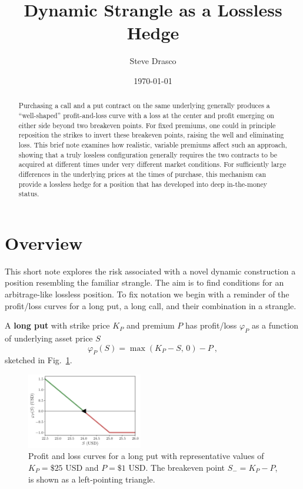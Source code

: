 \documentclass[aps,reprint]{revtex4-2}
\begin{document}
\title{Dynamic Strangle as a Lossless Hedge}
\author{Steve Drasco}
\date{\today}

\begin{abstract}
Purchasing a call and a put contract on the same underlying generally produces a “well-shaped” profit-and-loss curve with a loss at the center and profit emerging on either side beyond two breakeven points. For fixed premiums, one could in principle reposition the strikes to invert these breakeven points, raising the well and eliminating loss. This brief note examines how realistic, variable premiums affect such an approach, showing that a truly lossless configuration generally requires the two contracts to be acquired at different times under very different market conditions. For sufficiently large differences in the underlying prices at the times of purchase, this mechanism can provide a lossless hedge for a position that has developed into deep in-the-money status.
\end{abstract}

\maketitle

\section{Overview}

This short note explores the risk associated with a novel dynamic construction a position resembling the familiar strangle.  The aim is to find conditions for an arbitrage-like lossless position.  To fix notation we begin with a reminder of the profit/loss curves for a long put, a long call, and their combination in a strangle. 

A \textbf{long put} with strike price $K_P$ and premium $P$ has profit/loss $\varphi_P$ as a function of underlying asset price $S$
\begin{equation}
\varphi_P(S) = \max(K_P - S,\,0) - P~,
\end{equation}
sketched in Fig.~\ref{fig:put}.
\begin{figure}[hb]
    \centering
    \includegraphics[width=0.45\textwidth]{figs/put.pdf}
    \caption{Profit and loss curves for a long put with representative values of $K_P = \$25$ USD and $P = \$1$ USD.  The breakeven point $S_- = K_P - P$, is shown as a left-pointing triangle.}
    \label{fig:put}
\end{figure}
\end{document}
